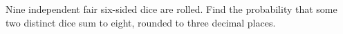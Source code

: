 Nine independent fair six-sided dice are rolled. Find the probability that some two distinct dice sum to eight, rounded to three decimal places.
